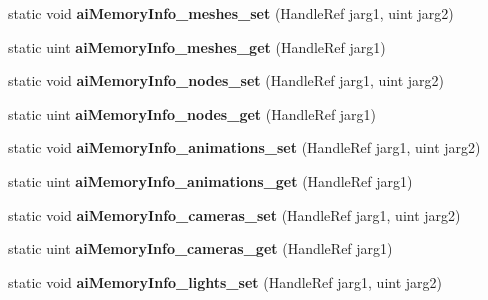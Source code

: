 \begin{DoxyCompactItemize}
\item 
\hypertarget{class_assimp_p_i_n_v_o_k_e_a75df0bcb8a3ebc95321d62ca7f69faeb}{static void {\bfseries ai\+Memory\+Info\+\_\+meshes\+\_\+set} (Handle\+Ref jarg1, uint jarg2)}\label{class_assimp_p_i_n_v_o_k_e_a75df0bcb8a3ebc95321d62ca7f69faeb}

\item 
\hypertarget{class_assimp_p_i_n_v_o_k_e_a83ad8637e2c0ac42f35b417fdbe7fae3}{static uint {\bfseries ai\+Memory\+Info\+\_\+meshes\+\_\+get} (Handle\+Ref jarg1)}\label{class_assimp_p_i_n_v_o_k_e_a83ad8637e2c0ac42f35b417fdbe7fae3}

\item 
\hypertarget{class_assimp_p_i_n_v_o_k_e_ac24e9eca31c7dcb893691208477efe67}{static void {\bfseries ai\+Memory\+Info\+\_\+nodes\+\_\+set} (Handle\+Ref jarg1, uint jarg2)}\label{class_assimp_p_i_n_v_o_k_e_ac24e9eca31c7dcb893691208477efe67}

\item 
\hypertarget{class_assimp_p_i_n_v_o_k_e_a4bbe76d4a3abbe9ca615324500dd56e1}{static uint {\bfseries ai\+Memory\+Info\+\_\+nodes\+\_\+get} (Handle\+Ref jarg1)}\label{class_assimp_p_i_n_v_o_k_e_a4bbe76d4a3abbe9ca615324500dd56e1}

\item 
\hypertarget{class_assimp_p_i_n_v_o_k_e_a1b659d89058fb0c6d38ff8b14cdc3be1}{static void {\bfseries ai\+Memory\+Info\+\_\+animations\+\_\+set} (Handle\+Ref jarg1, uint jarg2)}\label{class_assimp_p_i_n_v_o_k_e_a1b659d89058fb0c6d38ff8b14cdc3be1}

\item 
\hypertarget{class_assimp_p_i_n_v_o_k_e_a621dcd1f0885619a1e85baa9dfc80f66}{static uint {\bfseries ai\+Memory\+Info\+\_\+animations\+\_\+get} (Handle\+Ref jarg1)}\label{class_assimp_p_i_n_v_o_k_e_a621dcd1f0885619a1e85baa9dfc80f66}

\item 
\hypertarget{class_assimp_p_i_n_v_o_k_e_aa36c79c4b965b894f3fd32f44c18959c}{static void {\bfseries ai\+Memory\+Info\+\_\+cameras\+\_\+set} (Handle\+Ref jarg1, uint jarg2)}\label{class_assimp_p_i_n_v_o_k_e_aa36c79c4b965b894f3fd32f44c18959c}

\item 
\hypertarget{class_assimp_p_i_n_v_o_k_e_abe6b938ae43d8974bb02714c3f64d3a2}{static uint {\bfseries ai\+Memory\+Info\+\_\+cameras\+\_\+get} (Handle\+Ref jarg1)}\label{class_assimp_p_i_n_v_o_k_e_abe6b938ae43d8974bb02714c3f64d3a2}

\item 
\hypertarget{class_assimp_p_i_n_v_o_k_e_af0ad1d67f04143f8e28e44dcd6621a15}{static void {\bfseries ai\+Memory\+Info\+\_\+lights\+\_\+set} (Handle\+Ref jarg1, uint jarg2)}\label{class_assimp_p_i_n_v_o_k_e_af0ad1d67f04143f8e28e44dcd6621a15}


\end{DoxyCompactItemize}
